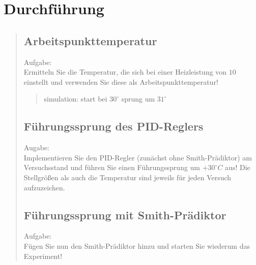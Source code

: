 \section{Durchführung}
\begin{quote}
    
    
    \subsection{Arbeitspunkttemperatur}
    \begin{quote}
        
    \end{quote}
    Aufgabe:\\
    Ermitteln Sie die Temperatur, die sich bei einer Heizleistung von $10$ einstellt und verwenden Sie diese als
    Arbeitspunkttemperatur!\vspace{1em}
    
    \begin{quote}
        simulation: start bei $30^{\circ}$ sprung um $31^{\circ}$
    \end{quote}
    
    \subsection{Führungssprung des PID-Reglers}
    
    Augabe:\\
    Implementieren Sie den PID-Regler (zunächst ohne Smith-Prädiktor) am Versuchsstand und führen Sie einen
    Führungssprung um $+30^{\circ} C$ aus! Die Stellgrößen als auch die Temperatur sind jeweils für jeden Versuch
    aufzuzeichen.\vspace{1em}
    
    \begin{quote}
        
    \end{quote}
    
    
    \subsection{Führungssprung mit Smith-Prädiktor}
    
    Aufgabe:\\
    Fügen Sie nun den Smith-Prädiktor hinzu und starten Sie wiederum das Experiment!\vspace{1em}
    
    \begin{quote}
        

\end{quote}
\end{quote}
